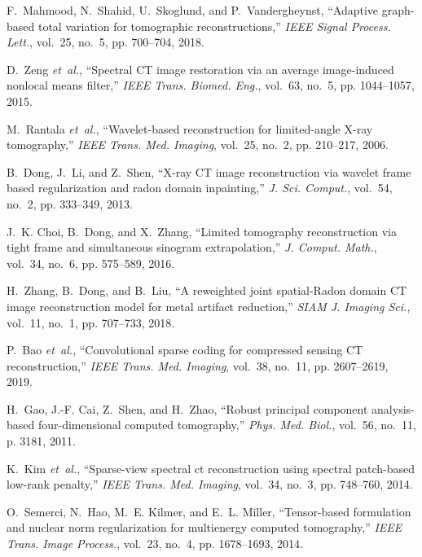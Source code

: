 \documentclass[journal,twoside]{IEEEtran}
\begin{document}
\begin{thebibliography}{10}
F.~Mahmood, N.~Shahid, U.~Skoglund, and P.~Vandergheynst, ``Adaptive
  graph-based total variation for tomographic reconstructions,'' \emph{IEEE
  Signal Process. Lett.}, vol.~25, no.~5, pp. 700--704, 2018.

D.~Zeng \emph{et~al.}, ``Spectral {CT} image restoration via an average
  image-induced nonlocal means filter,'' \emph{IEEE Trans. Biomed. Eng.},
  vol.~63, no.~5, pp. 1044--1057, 2015.

M.~Rantala \emph{et~al.}, ``Wavelet-based reconstruction for limited-angle
  {X}-ray tomography,'' \emph{IEEE Trans. Med. Imaging}, vol.~25, no.~2, pp.
  210--217, 2006.

B.~Dong, J.~Li, and Z.~Shen, ``X-ray {CT} image reconstruction via wavelet
  frame based regularization and radon domain inpainting,'' \emph{J. Sci.
  Comput.}, vol.~54, no.~2, pp. 333--349, 2013.

J.~K. Choi, B.~Dong, and X.~Zhang, ``Limited tomography reconstruction via
  tight frame and simultaneous sinogram extrapolation,'' \emph{J. Comput.
  Math.}, vol.~34, no.~6, pp. 575--589, 2016.

H.~Zhang, B.~Dong, and B.~Liu, ``A reweighted joint spatial-{Radon} domain {CT}
  image reconstruction model for metal artifact reduction,'' \emph{SIAM J.
  Imaging Sci.}, vol.~11, no.~1, pp. 707--733, 2018.

P.~Bao \emph{et~al.}, ``Convolutional sparse coding for compressed sensing {CT}
  reconstruction,'' \emph{IEEE Trans. Med. Imaging}, vol.~38, no.~11, pp.
  2607--2619, 2019.

H.~Gao, J.-F. Cai, Z.~Shen, and H.~Zhao, ``Robust principal component
  analysis-based four-dimensional computed tomography,'' \emph{Phys. Med.
  Biol.}, vol.~56, no.~11, p. 3181, 2011.

K.~Kim \emph{et~al.}, ``Sparse-view spectral ct reconstruction using spectral
  patch-based low-rank penalty,'' \emph{IEEE Trans. Med. Imaging}, vol.~34,
  no.~3, pp. 748--760, 2014.

O.~Semerci, N.~Hao, M.~E. Kilmer, and E.~L. Miller, ``Tensor-based formulation
  and nuclear norm regularization for multienergy computed tomography,''
  \emph{IEEE Trans. Image Process.}, vol.~23, no.~4, pp. 1678--1693, 2014.


\end{thebibliography}
\end{document}
